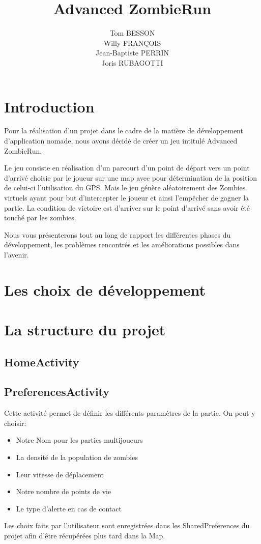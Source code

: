\documentclass{article}
\title{Advanced ZombieRun}     %
\author{Tom BESSON\\ Willy FRANÇOIS\\ Jean-Baptiste PERRIN\\ Joris RUBAGOTTI}
\begin{document}
\maketitle


\newpage


\tableofcontents


\newpage


\section{Introduction}


Pour la réalisation d'un projet dans le cadre de la matière de développement d'application nomade, nous avons décidé de créer un jeu intitulé Advanced\\ ZombieRun.

Le jeu consiste en réalisation d'un parcourt d'un point de départ vers un point d'arrivé choisie par le joueur sur une map avec pour détermination de la position de celui-ci l'utilisation du GPS. Mais le jeu génère aléatoirement des Zombies virtuels ayant pour but d'intercepter le joueur et ainsi l'empêcher de gagner la partie.
La condition de victoire est d'arriver sur le point d'arrivé sans avoir été touché par les zombies.

Nous vous présenterons tout au long de rapport les différentes phases du développement, les problèmes rencontrés et les améliorations possibles dans l'avenir.


\section{Les choix de développement}



\section{La structure du projet}


\subsection{HomeActivity}
\subsection{PreferencesActivity}


Cette activité permet de définir les différents paramètres de la partie. On peut y choisir:
\begin{itemize}
\item Notre Nom pour les parties multijoueurs
\item La densité de la population de zombies
\item Leur vitesse de déplacement
\item Notre nombre de points de vie
\item Le type d'alerte en cas de contact
\end{itemize}
Les choix faits par l'utilisateur sont enregistrées dans les SharedPreferences du projet afin d'être récupérées plus tard dans la Map.
\end{document}
